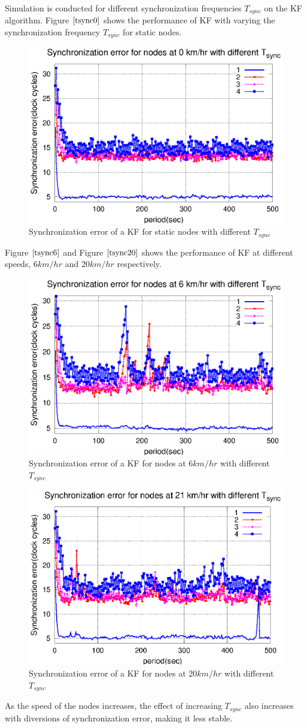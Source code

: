 \documentclass[a4paper,10pt]{report}
\begin{document}
\paragraph*{}
Simulation is conducted for different synchronization frequencies $T_{sync}$ on the KF algorithm. Figure $\ref{tsync0}$ shows the performance of KF with varying the synchronization frequency $T_{sync}$ for static nodes.
\begin{figure}[!h]
\centering
\includegraphics[width= 0.7 \textwidth]{tsync0}
\caption{Synchronization error of a KF for static nodes with different $T_{sync}$} \label{tsync0}
\end{figure}
Figure $\ref{tsync6}$ and Figure $\ref{tsync20}$ shows the performance of KF at different speeds, 6$km/hr$ and 20$km/hr$ respectively.
\begin{figure}[!h]
\centering
\includegraphics[width= 0.7 \textwidth]{tsync6}
\caption{Synchronization error of a KF for nodes at 6$km/hr$ with different $T_{sync}$} \label{tsync6}
\end{figure}
\begin{figure}[!h]
\centering
\includegraphics[width= 0.7 \textwidth]{tsync20}
\caption{Synchronization error of a KF for nodes at 20$km/hr$ with different $T_{sync}$} \label{tsync20}
\end{figure}
As the speed of the nodes increases, the effect of increasing $T_{sync}$ also increases with diversions of synchronization error, making it less stable.
\end{document}
